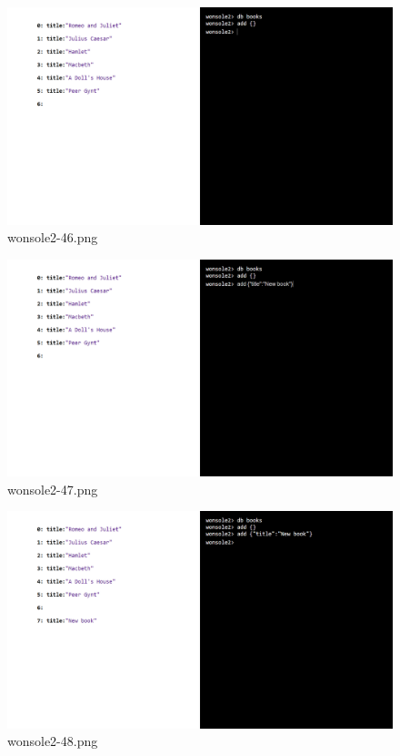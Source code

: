 \begin{figure}
\includegraphics[width=\textwidth]{screenshot/wonsole2/wonsole2-46.png}
\caption{wonsole2-46.png}
\label{wonsole2-46.png}
\end{figure}


\clearpage
\begin{figure}
\includegraphics[width=\textwidth]{screenshot/wonsole2/wonsole2-47.png}
\caption{wonsole2-47.png}
\label{wonsole2-47.png}
\end{figure}


\begin{figure}
\includegraphics[width=\textwidth]{screenshot/wonsole2/wonsole2-48.png}
\caption{wonsole2-48.png}
\label{wonsole2-48.png}
\end{figure}


